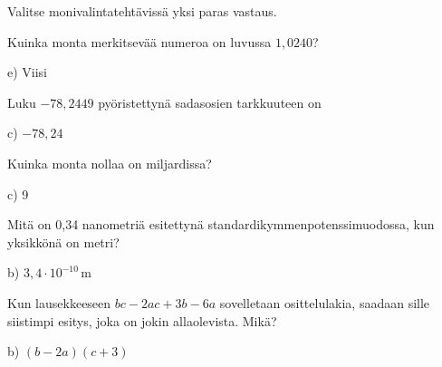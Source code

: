 Valitse monivalintatehtävissä yksi paras vastaus.

\begin{tehtava}
Kuinka monta merkitsevää numeroa on luvussa $1,0240$?
\begin{alakohdat}
\end{alakohdat}
\begin{vastaus}
e) Viisi
\end{vastaus}
\end{tehtava}

\begin{tehtava}
Luku $-78,2449$ pyöristettynä sadasosien tarkkuuteen on
\begin{alakohdat}
\end{alakohdat}
\begin{vastaus}
c) $-78,24$
\end{vastaus}
\end{tehtava}

\begin{tehtava}
Kuinka monta nollaa on miljardissa?
\begin{alakohdat}
\end{alakohdat}
\begin{vastaus}
c) 9
\end{vastaus}
\end{tehtava}

\begin{tehtava}
Mitä on 0,34 nanometriä esitettynä standardikymmenpotenssimuodossa, kun yksikkönä on metri?
\begin{alakohdat}
\end{alakohdat}
\begin{vastaus}
b) $3,4 \cdot 10^{-10}$\,m
\end{vastaus}
\end{tehtava}

\begin{tehtava}
Kun lausekkeeseen $bc-2ac+3b-6a$ sovelletaan osittelulakia, saadaan sille siistimpi esitys, joka on jokin allaolevista. Mikä?
	\begin{alakohdat}
	\end{alakohdat}
    \begin{vastaus}
	b) $(b-2a)(c+3)$
    \end{vastaus}
\end{tehtava}

